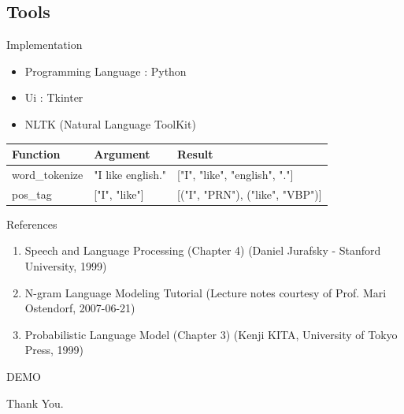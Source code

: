 \documentclass{beamer}
\begin{document}
\subsection{Tools}
\begin{frame}{Implementation}
    \begin{itemize}
        \item Programming Language : Python
        \item Ui : Tkinter
        \item NLTK (Natural Language ToolKit)
    \end{itemize}
    \begin{table}
        \flushleft
        \begin{tabular}{|l|l|l|}
            \hline
            \textbf{Function} & \textbf{Argument} & \textbf{Result}\\\hline
            word\_tokenize & "I like english." & ["I", "like", "english", "."]\\\hline
            pos\_tag & ["I", "like"] & [("I", "PRN"), ("like", "VBP")]\\
            \hline
        \end{tabular}
    \end{table}
\end{frame}


\begin{frame}{References}
    \begin{enumerate}
        \item Speech and Language Processing (Chapter 4) (Daniel Jurafsky - Stanford University, 1999)
        \item N-gram Language Modeling Tutorial (Lecture notes courtesy of Prof. Mari Ostendorf, 2007-06-21)
        \item Probabilistic Language Model (Chapter 3) (Kenji KITA, University of Tokyo Press, 1999)
    \end{enumerate}
\end{frame}

\begin{frame}
    \centering
    \Huge DEMO
\end{frame}


\begin{frame}
    \centering
    \Huge Thank You.
\end{frame}

\end{document}
